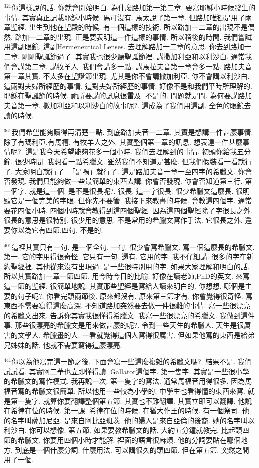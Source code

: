 \documentclass{book}
\begin{document}
$^{321}$你這樣說的話.
你就會開始明白.
為什麼路加第一第二章.
要寫耶穌小時候發生的事情.
其實真正記載耶穌小時候.
馬可沒有.
馬太說了第一章.
但路加唯獨是用了兩章聖經.
出生到他在聖殿的時候.
有一個這樣的技術.
所以路加一二章的出現不是偶然.
路加一二章的出現.
正是要表明這一件這樣的事情.
所以稍後的時間.
我們嘗試用這副眼鏡.
這副Hermeneutical Lenses.
去理解路加一二章的意思.
你去到路加一二章.
剛剛聖誕節過了.
其實我也很少聽聖誕節裡.
講撒加利亞和以利沙白.
通常我們會講第二章.
講牧羊人.
我們會講多一點.
講馬拉夫音第一章會多一點.
路加夫音第一章其實.
不太多在聖誕節出現.
尤其是你不會講撒加利亞.
你不會講以利沙白.
這兩對夫婦所經歷的事情.
這對夫婦所經歷的事情.
好像不是和我們平時所理解的.
耶穌在聖誕節的時候.
祂所要講的訊息很雷及.
不是的.
問題就是問.
為何要講路加夫音第一章.
撒加利亞和以利沙白的故事呢?.
這成為了我們用這副.
全色的眼鏡去讀的時候.

$^{361}$我們希望能夠讀得再清楚一點.
到底路加夫音一二章.
其實是想講一件甚麼事情.
除了有瑪利亞,有馬槽.
有牧羊人之外.
其實整個第一章的訊息.
想表達一件甚麼事情呢?.
這是我今天希望能夠花多一個小時.
我們去理解到的事情.
初頭你給我五分鐘.
很少時間.
我想看一點希臘文.
雖然我們不知道是甚麼.
但我們假裝看一看就行了.
大家明白就行了.
「是喎」就行了.
這是路加夫音一章一至四字的希臘文.
你會否發現.
我們只能夠做一些最簡單的東西去講.
你會否發現.
你會否知道第三行.
第一個字.
就是這一個.
是不是很長呢?.
很長.
這一字很長.
很少希臘文這麼長.
很明顯它是一個完美的字眼.
但你先不要管.
我接下來教書的時候.
會教這四個字.
通常要花四個小時.
四個小時就會教得到這四個聖經.
因為這四個聖經除了字很長之外.
很長的意思是很特別.
很少用的意思.
不是常用的希臘文寫作手法.
它很長之外.
還要你以為它有四節,四句.
不是的.

$^{401}$這裡其實只有一句.
是一個全句.
一句.
很少會寫希臘文.
寫一個這麼長的希臘文.
第一.
它的字用得很奇怪.
它只有一句.
還有.
它用的字.
我不仔細講.
很多的字在新約聖經裡.
其他從來沒有出現過.
是一些很特別用的字.
如果大家理解和明白的話.
所以其實路加一章一節四節.
用今時今日的比喻.
好像在讀老師,PhD的英文.
來寫這一節的聖經.
很簡單地說.
其實那些聖經是寫給人讀來明白的.
你想想.
哪個是主要的句子呢?.
你看完頭兩節後.
原來都沒有.
原來第三節才有.
你會覺得很奇怪.
寫東西不需要寫得這麼高深.
不知道路加突然要去做一件很難的事情.
寫一些很漂亮的希臘文出來.
告訴你其實我很懂得希臘文.
我寫一些很漂亮的希臘文.
我做到這件事.
那些很漂亮的希臘文是用來做甚麼的呢?.
令到一些天生的希臘人.
天生是很厲害的文學人.
希臘畫的人.
一看就覺得這個人寫得很厲害.
但如果他寫的東西是給弟兄姊妹的話.
他就不需要寫得這麼漂亮.

$^{441}$你以為他寫完這一節之後.
下面會寫一些這麼複雜的希臘文嗎?.
結果不是.
我們試試看.
其實阿二華也立即懂得讀.
Gallator這個字.
第一隻字.
其實是一些很小學的希臘文的寫作模式.
我再說一次.
第一隻字的寫法.
通常馬福音用得很多.
因為馬福音寫的希臘文很簡單.
所以他用一些較為小學的.
中學生也看得懂的東西來寫.
就是第一隻字.
就算你要翻譯整個第五節.
其實也不難翻譯.
其實立即可以翻譯.
他說在希律在位的時候.
第一課.
希律在位的時候.
在猶大作王的時候.
有一個祭司.
他的名字叫薩加尼亞.
是來自阿比亞班茨.
他的婦人是來自亞倫的後裔.
她的名字叫以利沙白.
你可以想像.
第五節.
如果要教希臘文的話.
大約五分鐘就教完.
比起頭四節的希臘文.
你要用四個小時才能解.
裡面的語言很麻煩.
他的分詞要貼在哪個地方.
到底是一個什麼分詞.
什麼用法.
可以講很久的頭四節.
但在第五節.
突然之間用了一個.
\end{document}
